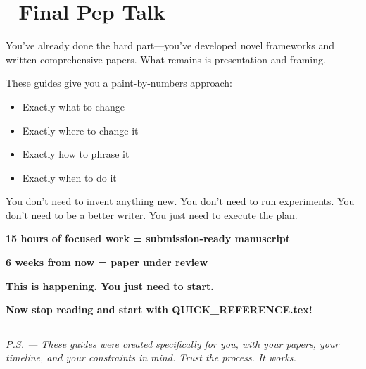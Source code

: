 \documentclass[11pt]{article}
\begin{document}
\section*{💯 Final Pep Talk}

You've already done the hard part—you've developed novel frameworks and written comprehensive papers. What remains is presentation and framing.

These guides give you a paint-by-numbers approach:
\begin{itemize}
    \item Exactly what to change
    \item Exactly where to change it
    \item Exactly how to phrase it
    \item Exactly when to do it
\end{itemize}

You don't need to invent anything new. You don't need to run experiments. You don't need to be a better writer. You just need to execute the plan.

\textbf{15 hours of focused work = submission-ready manuscript}

\textbf{6 weeks from now = paper under review}

\textbf{This is happening. You just need to start.}

\vspace{2em}
\begin{center}
\Large\textbf{Now stop reading and start with QUICK\_REFERENCE.tex!}
\end{center}

\vspace{2em}
\hrule
\vspace{0.5em}

\textit{P.S. — These guides were created specifically for you, with your papers, your timeline, and your constraints in mind. Trust the process. It works.}
\end{document}
